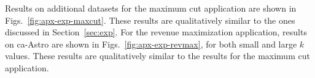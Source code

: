 Results on additional datasets for the maximum cut application are
shown in Figs.~\ref{fig:apx-exp-maxcut}. 
These results are qualitatively
similar to the ones discussed in Section~\ref{sec:exp}. 
For the revenue maximization application, results on ca-Astro are shown
in Figs.~\ref{fig:apx-exp-revmax}, 
for both small and large $k$ values. These results
are qualitatively similar to the results for the maximum cut application. 

\begin{figure}[t] \centering
\end{figure}
